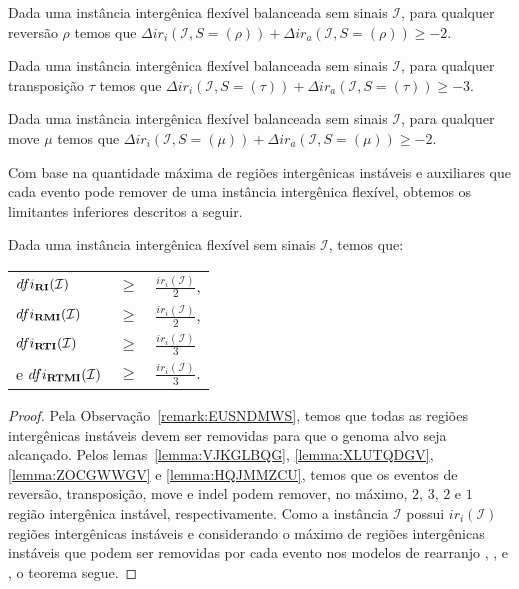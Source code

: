 \begin{lemma}\label{lemma:IERALSKC}
Dada uma instância intergênica flexível balanceada sem sinais $\mathcal{I}$, para qualquer reversão $\rho$ temos que $\Delta ir_i(\mathcal{I}, S = (\rho)) + \Delta ir_a(\mathcal{I}, S = (\rho)) \ge -2$.
\end{lemma}

\begin{lemma}\label{lemma:FOXQSODF}
Dada uma instância intergênica flexível balanceada sem sinais $\mathcal{I}$, para qualquer transposição $\tau$ temos que $\Delta ir_i(\mathcal{I}, S = (\tau)) + \Delta ir_a(\mathcal{I}, S = (\tau)) \ge -3$.
\end{lemma}

\begin{lemma}\label{lemma:AXMNYRLB}
Dada uma instância intergênica flexível balanceada sem sinais $\mathcal{I}$, para qualquer move $\mu$ temos que $\Delta ir_i(\mathcal{I}, S = (\mu)) + \Delta ir_a(\mathcal{I}, S = (\mu)) \ge -2$.
\end{lemma}

Com base na quantidade máxima de regiões intergênicas instáveis e auxiliares que cada evento pode remover de uma instância intergênica flexível, obtemos os  limitantes inferiores descritos a seguir.

\begin{theorem}\label{theorem:BOTBXFZQ}
Dada uma instância intergênica flexível sem sinais $\mathcal{I}$, temos que:

\begin{tabular}{lll}
  $dfi_{\textbf{RI}}(\mathcal{I})$     & $ \ge $ & $\frac{ir_i(\mathcal{I})}{2}$, \\
  $dfi_{\textbf{RMI}}(\mathcal{I})$    & $ \ge $ & $\frac{ir_i(\mathcal{I})}{2}$, \\
  $dfi_{\textbf{RTI}}(\mathcal{I})$    & $ \ge $ & $\frac{ir_i(\mathcal{I})}{3}$  \\
  e $dfi_{\textbf{RTMI}}(\mathcal{I})$ & $ \ge $ & $\frac{ir_i(\mathcal{I})}{3}$. \\
\end{tabular}
\end{theorem}
\begin{proof}
Pela Observação~\ref{remark:EUSNDMWS}, temos que todas as regiões intergênicas instáveis devem ser removidas para que o genoma alvo seja alcançado. Pelos lemas~\ref{lemma:VJKGLBQG}, \ref{lemma:XLUTQDGV}, \ref{lemma:ZOCGWWGV} e \ref{lemma:HQJMMZCU}, temos que os eventos de reversão, transposição, move e indel podem remover, no máximo, $2$, $3$, $2$ e $1$ região intergênica instável, respectivamente. Como a instância $\mathcal{I}$ possui $ir_i(\mathcal{I})$ regiões intergênicas instáveis e considerando o máximo de regiões intergênicas instáveis que podem ser removidas por cada evento nos modelos de rearranjo \RI{}, \RMI{}, \RTI{} e \RTMI{}, o teorema segue.
\end{proof}

